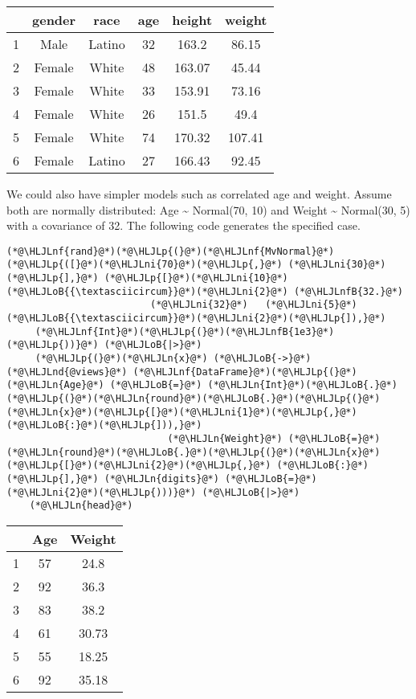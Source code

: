 \documentclass[12pt,a4paper]{article}
\newcommand{\HLJLn}[1]{#1}
\newcommand{\HLJLnd}[1]{\textcolor[RGB]{214,102,97}{#1}}
\newcommand{\HLJLnf}[1]{\textcolor[RGB]{66,102,213}{#1}}
\newcommand{\HLJLnfB}[1]{\textcolor[RGB]{59,151,46}{#1}}
\newcommand{\HLJLni}[1]{\textcolor[RGB]{59,151,46}{#1}}
\newcommand{\HLJLoB}[1]{\textcolor[RGB]{102,102,102}{\textbf{#1}}}
\newcommand{\HLJLp}[1]{#1}
\begin{document}
\begin{tabular}{r|ccccc}
	& gender & race & age & height & weight\\
	\hline
	1 & Male & Latino & 32 & 163.2 & 86.15 \\
	2 & Female & White & 48 & 163.07 & 45.44 \\
	3 & Female & White & 33 & 153.91 & 73.16 \\
	4 & Female & White & 26 & 151.5 & 49.4 \\
	5 & Female & White & 74 & 170.32 & 107.41 \\
	6 & Female & Latino & 27 & 166.43 & 92.45 \\
\end{tabular}


We could also have simpler models such as correlated age and weight. Assume both are normally distributed: Age {\sim} Normal(70, 10) and Weight {\sim} Normal(30, 5) with a covariance of 32. The following code generates the specified case.


\begin{lstlisting}
(*@\HLJLnf{rand}@*)(*@\HLJLp{(}@*)(*@\HLJLnf{MvNormal}@*)(*@\HLJLp{([}@*)(*@\HLJLni{70}@*)(*@\HLJLp{,}@*) (*@\HLJLni{30}@*)(*@\HLJLp{],}@*) (*@\HLJLp{[}@*)(*@\HLJLni{10}@*)(*@\HLJLoB{{\textasciicircum}}@*)(*@\HLJLni{2}@*) (*@\HLJLnfB{32.}@*)
                         (*@\HLJLni{32}@*)   (*@\HLJLni{5}@*)(*@\HLJLoB{{\textasciicircum}}@*)(*@\HLJLni{2}@*)(*@\HLJLp{]),}@*)
     (*@\HLJLnf{Int}@*)(*@\HLJLp{(}@*)(*@\HLJLnfB{1e3}@*)(*@\HLJLp{))}@*) (*@\HLJLoB{|>}@*)
     (*@\HLJLp{(}@*)(*@\HLJLn{x}@*) (*@\HLJLoB{->}@*) (*@\HLJLnd{@views}@*) (*@\HLJLnf{DataFrame}@*)(*@\HLJLp{(}@*)(*@\HLJLn{Age}@*) (*@\HLJLoB{=}@*) (*@\HLJLn{Int}@*)(*@\HLJLoB{.}@*)(*@\HLJLp{(}@*)(*@\HLJLn{round}@*)(*@\HLJLoB{.}@*)(*@\HLJLp{(}@*)(*@\HLJLn{x}@*)(*@\HLJLp{[}@*)(*@\HLJLni{1}@*)(*@\HLJLp{,}@*)(*@\HLJLoB{:}@*)(*@\HLJLp{])),}@*)
                            (*@\HLJLn{Weight}@*) (*@\HLJLoB{=}@*) (*@\HLJLn{round}@*)(*@\HLJLoB{.}@*)(*@\HLJLp{(}@*)(*@\HLJLn{x}@*)(*@\HLJLp{[}@*)(*@\HLJLni{2}@*)(*@\HLJLp{,}@*) (*@\HLJLoB{:}@*)(*@\HLJLp{],}@*) (*@\HLJLn{digits}@*) (*@\HLJLoB{=}@*) (*@\HLJLni{2}@*)(*@\HLJLp{)))}@*) (*@\HLJLoB{|>}@*)
    (*@\HLJLn{head}@*)
\end{lstlisting}


\begin{tabular}{r|cc}
	& Age & Weight\\
	\hline
	1 & 57 & 24.8 \\
	2 & 92 & 36.3 \\
	3 & 83 & 38.2 \\
	4 & 61 & 30.73 \\
	5 & 55 & 18.25 \\
	6 & 92 & 35.18 \\
\end{tabular}
\end{document}
